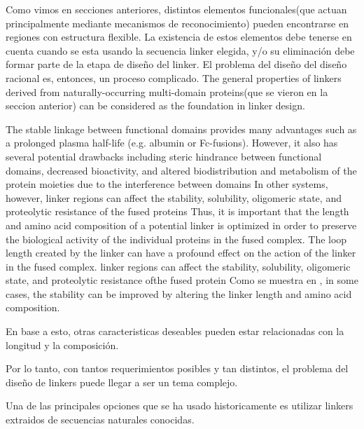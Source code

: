 Como vimos en secciones anteriores, distintos elementos funcionales(que actuan principalmente mediante mecanismos de reconocimiento) pueden encontrarse en regiones con estructura flexible. 
La existencia de estos elementos debe tenerse en cuenta cuando se esta usando la secuencia linker elegida, y/o su eliminación debe formar parte de la etapa de diseño del linker.
El problema del diseño del diseño racional es, entonces, un proceso complicado.
The general properties of linkers derived from naturally-occurring multi-domain proteins(que se vieron en la seccion anterior) can be considered as the foundation in linker design. 

The stable linkage between functional domains provides many advantages such as a prolonged plasma half-life (e.g. albumin or Fc-fusions). 
However, it also has several potential drawbacks including steric hindrance between functional domains, decreased bioactivity, and altered biodistribution and metabolism of the protein moieties due to the interference between domains 
In other systems, however, linker regions can affect the stability, solubility, oligomeric state, and proteolytic resistance of the fused proteins
Thus, it is important that the length and amino acid composition of a potential linker is optimized in order to preserve the biological activity of the individual proteins in the fused complex.
The loop length created by the linker can have a profound effect on the action of the linker in the fused complex. \cite{nagi1997inverse}
linker regions can affect the stability, solubility, oligomeric state, and proteolytic resistance ofthe fused protein
Como se muestra en \cite{robinson1998optimizing}, in some cases, the stability can be improved by altering the linker length and amino acid composition. 

En base a esto, otras caracteristicas deseables pueden estar relacionadas con la longitud y la composición. 



Por lo tanto, con tantos requerimientos posibles y tan distintos, el problema del diseño de linkers puede llegar a ser un tema complejo.






Una de las principales opciones que se ha usado historicamente es utilizar linkers extraidos de secuencias naturales conocidas.

